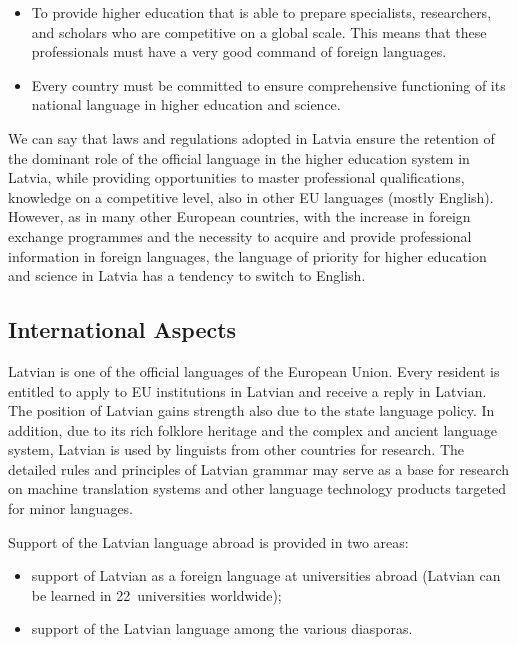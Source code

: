 \begin{multicols}{2}
\begin{itemize}
\item  To provide higher education that is able to prepare specialists, researchers, and scholars who are competitive on a global scale.
This means that these professionals must have a very good command of foreign languages.
\item  Every country must be committed to ensure comprehensive functioning of its national language in higher education and science.
\end{itemize}

We can say that laws and regulations adopted in Latvia ensure the retention of the dominant role of the official language in the higher education system in Latvia, while providing opportunities to master professional qualifications, knowledge on a competitive level, also in other EU languages (mostly English).
However, as in many other European countries, with the increase in foreign exchange programmes and the necessity to acquire and provide professional information in foreign languages, the language of priority for higher education and science in Latvia has a tendency to switch to English.

\subsection{International Aspects}

 Latvian is one of the official languages of the European Union.
Every resident is entitled to apply to EU institutions in Latvian and receive a reply in Latvian.
The position of Latvian gains strength also due to the state language policy.
In addition, due to its rich folklore heritage and the complex and ancient language system, Latvian is used by linguists from other countries for research.
The detailed rules and principles of Latvian grammar may serve as a base for research on machine translation systems and other language technology products targeted for minor languages.

Support of the Latvian language abroad is provided in two areas:

\begin{itemize}
\item  support of Latvian as a foreign language at universities abroad (Latvian can be learned in 22~universities worldwide);
\item  support of the Latvian language among the various diasporas.
\end{itemize}


\end{multicols}
